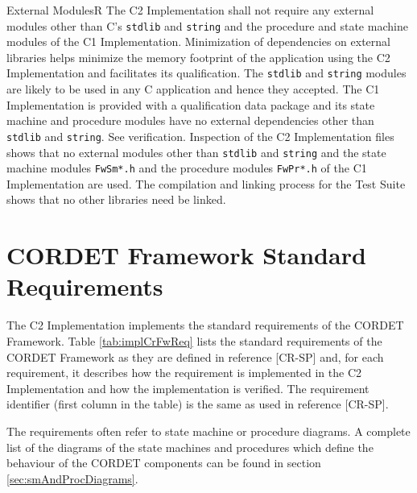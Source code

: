 \documentclass{pnp_article}
\begin{document}
\begin{fwReq}{External Modules}{R}
{The C2 Implementation shall not require any external modules other than C's \texttt{stdlib} and \texttt{string} and the procedure and state machine modules of the C1 Implementation.}
{Minimization of dependencies on external libraries helps minimize the memory footprint of the application using the C2 Implementation and facilitates its qualification. The \texttt{stdlib} and \texttt{string} modules are likely to be used in any C application and hence they accepted. The C1 Implementation is provided with a qualification data package and its state machine and procedure modules have no external dependencies other than \texttt{stdlib} and \texttt{string}.}
{See verification.} 
{Inspection of the C2 Implementation files shows that no external modules other than \texttt{stdlib} and \texttt{string} and the state machine modules \texttt{FwSm*.h} and the procedure modules \texttt{FwPr*.h} of the C1 Implementation are used. The compilation and linking process for the Test Suite shows that no other libraries need be linked.}
\end{fwReq}



\appendix
\section{CORDET Framework Standard Requirements}\label{sec:implCrFwReq}
The C2 Implementation implements the standard requirements of the CORDET Framework. 
Table \ref{tab:implCrFwReq} lists the standard requirements of the CORDET Framework as they are defined in reference [CR-SP] and, for each requirement, it describes how the requirement is implemented in the C2 Implementation and how the implementation is verified. The requirement identifier (first column in the table) is the same as used in reference [CR-SP].

The requirements often refer to state machine or procedure diagrams. A complete list of the diagrams of the state machines and procedures which define the behaviour of the CORDET components can be found in section \ref{sec:smAndProcDiagrams}.
\end{document}
